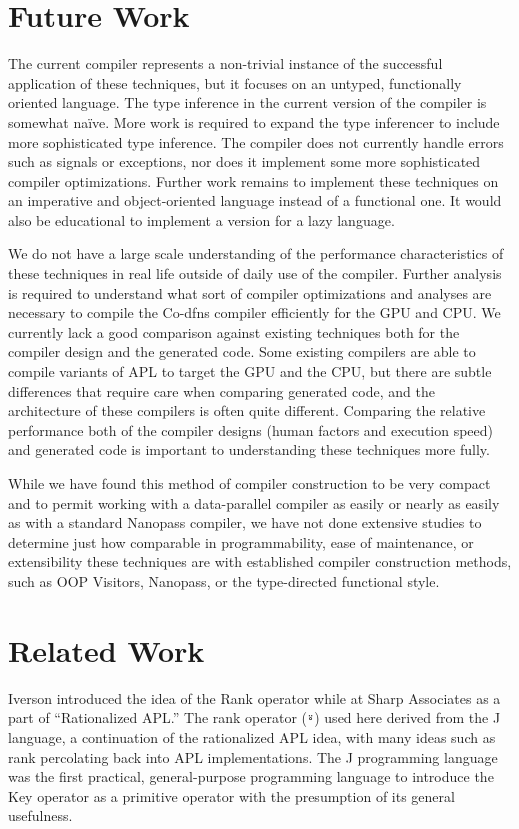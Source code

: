 ﻿\documentclass[numbers,10pt,preprint]{sigplanconf}
\begin{document}
\section{Future Work}

The current compiler represents a non-trivial instance of the successful application of these techniques, but it focuses on an untyped, functionally oriented language. The type inference in the current version of the compiler is somewhat na\"ive. More work is required to expand the type inferencer to include more sophisticated type inference. The compiler does not currently handle errors such as signals or exceptions, nor does it implement some more sophisticated compiler optimizations. Further work remains to implement these techniques on an imperative and object-oriented language instead of a functional one. It would also be educational to implement a version for a lazy language.

We do not have a large scale understanding of the performance characteristics of these techniques in real life outside of daily use of the compiler. Further analysis is required to understand what sort of compiler optimizations and analyses are necessary to compile the Co-dfns compiler efficiently for the GPU and CPU. We currently lack a good comparison against existing techniques both for the compiler design and the generated code. Some existing compilers are able to compile variants of APL to target the GPU and the CPU, but there are subtle differences that require care when comparing generated code, and the architecture of these compilers is often quite different. Comparing the relative performance both of the compiler designs (human factors and execution speed) and generated code is important to understanding these techniques more fully.

While we have found this method of compiler construction to be very compact and to permit working with a data-parallel compiler as easily or nearly as easily as with a standard Nanopass compiler, we have not done extensive studies to determine just how comparable in programmability, ease of maintenance, or extensibility these techniques are with established compiler construction methods, such as OOP Visitors, Nanopass, or the type-directed functional style.

\section{Related Work}

Iverson introduced the idea of the Rank operator while at Sharp Associates \cite{iverson1983rationalized} as a part of ``Rationalized APL.'' The rank operator (\verb;⍤;) used here derived from the J language, a continuation of the rationalized APL idea, with many ideas such as rank percolating back into APL implementations. \cite{bernecky1987rank,hui1995rank} The J programming language \cite{hui2014key} was the first practical, general-purpose programming language to introduce the Key operator as a primitive operator with the presumption of its general usefulness.
\end{document}
